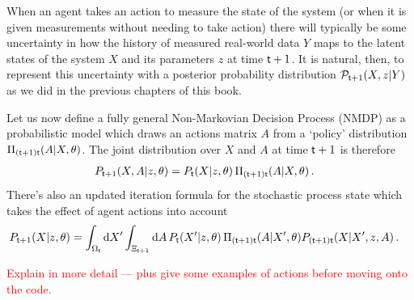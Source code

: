 When an agent takes an action to measure the state of the system (or when it is given measurements without needing to take action) there will typically be some uncertainty in how the history of measured real-world data $Y$ maps to the latent states of the system $X$ and its parameters $z$ at time ${\sf t}+1$. It is natural, then, to represent this uncertainty with a posterior probability distribution ${\cal P}_{{\sf t}+1}(X,z\vert Y)$ as we did in the previous chapters of this book. 

Let us now define a fully general Non-Markovian Decision Process (NMDP) as a probabilistic model which draws an actions matrix $A$ from a `policy' distribution $\Pi_{({\sf t}+1){\sf t}}(A\vert X,\theta)$. The joint distribution over $X$ and $A$ at time ${\sf t}+1$ is therefore
\begin{align}
P_{{\sf t}+1}(X,A\vert z, \theta ) &= P_{{\sf t}}(X\vert z,\theta ) \,\Pi_{({\sf t}+1){\sf t}}(A\vert X,\theta) \,.
\end{align}
There's also an updated iteration formula for the stochastic process state which takes the effect of agent actions into account
\begin{align}
P_{{\sf t}+1}(X\vert z,\theta ) &= \int_{\Omega_{{\sf t}}}{\rm d}X' \int_{\Xi_{{\sf t}+1}}{\rm d}A \, P_{{\sf t}}(X'\vert z,\theta ) \, \Pi_{({\sf t}+1){\sf t}}(A\vert X',\theta)P_{({\sf t}+1){\sf t}}(X\vert X',z,A)  \,.
\end{align}

\textcolor{red}{Explain in more detail --- plus give some examples of actions before moving onto the code.}
